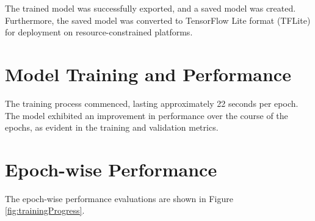 The trained model was successfully exported, and a saved model was created. Furthermore, the saved model was converted to TensorFlow Lite format (TFLite) for deployment on resource-constrained platforms.


\section{Model Training and Performance}

The training process commenced, lasting approximately 22 seconds per epoch. The model exhibited an improvement in performance over the course of the epochs, as evident in the training and validation metrics.

\section{Epoch-wise Performance}

The epoch-wise performance evaluations are shown in Figure \ref{fig:trainingProgress}.

